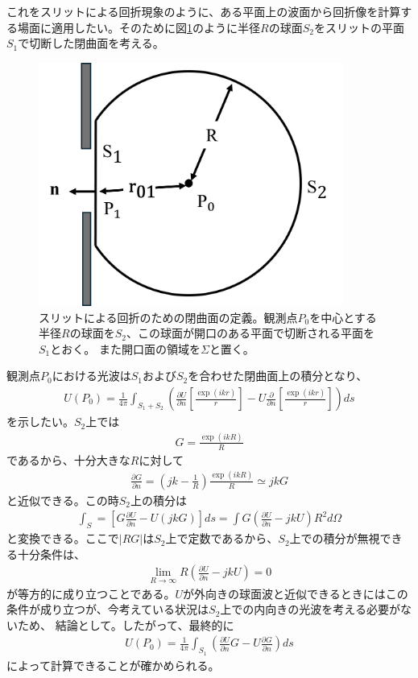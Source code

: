 \documentclass[a4paper,11pt,uplatex]{jsbook}
\begin{document}
これをスリットによる回折現象のように、ある平面上の波面から回折像を計算する場面に適用したい。そのために図\ref{fig:diff_kir}のように半径$R$の球面$S_2$をスリットの平面$S_1$で切断した閉曲面を考える。
\begin{figure}[h]
  \centering
  \includegraphics[width=10cm]{image/2-diffraction_kir.png}
  \caption[スリットによる回折の模式図]{スリットによる回折のための閉曲面の定義。観測点$P_0$を中心とする半径$R$の球面を$S_2$、この球面が開口のある平面で切断される平面を$S_1$とおく。
  また開口面の領域を$\Sigma$と置く。}\label{fig:diff_kir}
\end{figure}
観測点$P_0$における光波は$S_1$および$S_2$を合わせた閉曲面上の積分となり、
\begin{eqnarray}
  U(P_0) = \frac{1}{4\pi}\int_{S_1+S_2} \left( \frac{\partial U}{\partial n} \left[ \frac{\exp(ikr)}{r} \right] - U\frac{\partial}{\partial n} \left[ \frac{\exp(ikr)}{r}\right] \right) ds
\end{eqnarray}
を示したい。$S_2$上では
\begin{eqnarray}
  G = \frac{\exp(ikR)}{R} 
\end{eqnarray}
であるから、十分大きな$R$に対して
\begin{eqnarray}
  \frac{\partial G}{\partial n} = \left( jk-\frac{1}{R}\right)\frac{\exp(ikR)}{R} \simeq jkG
\end{eqnarray}
と近似できる。この時$S_2$上の積分は
\begin{eqnarray}
  \int_S  = \left[ G\frac{\partial U}{\partial n} - U (jkG)\right]ds = \int G(\frac{\partial U}{\partial n} -jkU)R^2d\Omega
\end{eqnarray}
と変換できる。ここで$|RG|$は$S_2$上で定数であるから、$S_2$上での積分が無視できる十分条件は、
\begin{eqnarray}
  \lim_{R\rightarrow \infty} R\left(\frac{\partial U}{\partial n} -jkU \right) = 0
\end{eqnarray}
が等方的に成り立つことである。$U$が外向きの球面波と近似できるときにはこの条件が成り立つが、今考えている状況は$S_2$上での内向きの光波を考える必要がないため、
結論として。したがって、最終的に
\begin{eqnarray}
  U(P_0) = \frac{1}{4\pi}\int_{S_1} \left( \frac{\partial U}{\partial n} G - U\frac{\partial G}{\partial n}  \right) ds
\end{eqnarray}
によって計算できることが確かめられる。
\end{document}
